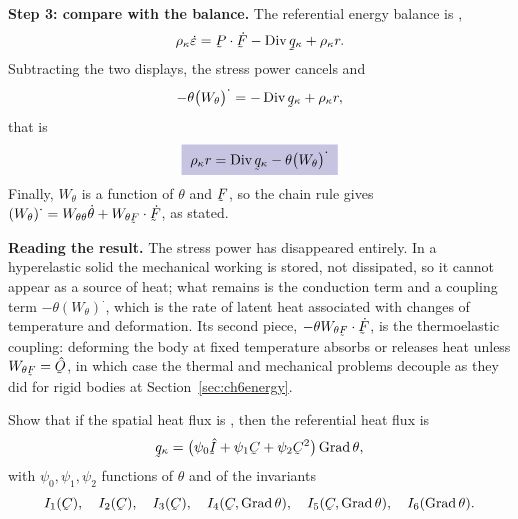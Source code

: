 \begin{solution}
\textbf{Step 3: compare with the balance.} The referential energy
balance is ,
\[
   \rho_{\kappa}\dot\varepsilon
   =\bP\cdot\dot\bF-\Dvg\bq_{\kappa}+\rho_{\kappa}r .
\]
Subtracting the two displays, the stress power cancels and
\[
   -\theta\big(W_{\theta}\big)^{\textstyle\cdot}
   =-\Dvg\bq_{\kappa}+\rho_{\kappa}r ,
\]
that is
\[
   \boxed{\;\rho_{\kappa}r=\Dvg\bq_{\kappa}
   -\theta\big(W_{\theta}\big)^{\textstyle\cdot}\;}
\]
Finally, $W_{\theta}$ is a function of $\theta$ and $\bF$, so the chain
rule gives $(W_{\theta})^{\textstyle\cdot}=W_{\theta\theta}\dot\theta
+W_{\theta\bF}\cdot\dot\bF$, as stated.

\textbf{Reading the result.} The stress power has disappeared entirely.
In a hyperelastic solid the mechanical working is stored, not dissipated,
so it cannot appear as a source of heat; what remains is the conduction
term and a coupling term $-\theta(W_{\theta})^{\textstyle\cdot}$,
which is the rate of latent heat associated with changes of temperature
and deformation. Its second piece, $-\theta W_{\theta\bF}\cdot\dot\bF$,
is the thermoelastic coupling: deforming the body at fixed temperature
absorbs or releases heat unless $W_{\theta\bF}=\hOb$, in which case the
thermal and mechanical problems decouple as they did for rigid bodies at
Section~\ref{sec:ch6energy}.
\end{solution}

\begin{problem}
Show that if the spatial heat flux is , then the referential
heat flux is
\[
   \bq_{\kappa}=\big(\psi_{0}\hI+\psi_{1}\bC+\psi_{2}\bC^{2}\big)
   \Grad\theta ,
\]
with $\psi_{0},\psi_{1},\psi_{2}$ functions of $\theta$ and of the
invariants
\[
   I_{1}(\bC),\quad I_{2}(\bC),\quad I_{3}(\bC),\quad
   I_{4}(\bC,\Grad\theta),\quad I_{5}(\bC,\Grad\theta),\quad
   I_{6}(\Grad\theta).
\]
\end{problem}

